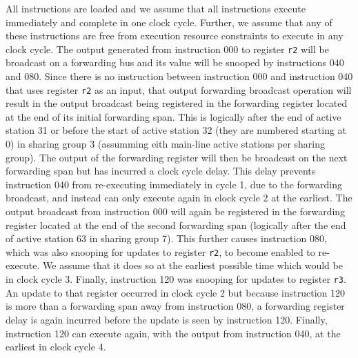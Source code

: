 All instructions are loaded and we assume that all
instructions execute immediately and complete in one clock cycle.
Further, we assume that any of these instructions are free
from execution resource constraints to execute in any clock cycle.
The output generated from instruction 000 to register
{\tt r2}
will be broadcast on a forwarding bus and its value will be snooped
by instructions 040 and 080.  Since there is no instruction
between instruction 000 and instruction 040 that uses 
register
{\tt r2} as an input,
that output forwarding broadcast operation will result
in the output broadcast being registered in the forwarding register
located at the end of its initial forwarding span.  This
is logically after the end of active station 31 or before
the start of active station
32
(they are numbered starting at 0) in sharing group 3 (assumming
eith main-line active stations per sharing group).
The output of the forwarding register will then be broadcast
on the next forwarding span but has incurred a clock cycle delay.
This delay prevents instruction 040 from re-executing immediately
in cycle 1, due to the forwarding broadcast, and instead can only execute again in clock cycle 2
at the earliest.  The output broadcast from instruction 000
will again be registered in the forwarding register located
at the end of the second forwarding span (logically after the
end of active station 63 in sharing group 7).  
This further causes instruction 080,
which was also snooping for updates to register
{\tt r2},
to become enabled to re-execute.  We assume that it does so
at the earliest possible time which would be in clock cycle 3.
Finally, instruction 120 was snooping for updates to register
{\tt r3}.
An update to that register occurred in clock cycle 2 but because
instruction 120 is more than a forwarding span away from instruction
080, a forwarding register delay is again incurred before the update
is seen by instruction 120.  Finally, instruction 120 can execute
again, with the output from instruction 040,
at the earliest in clock cycle 4.

